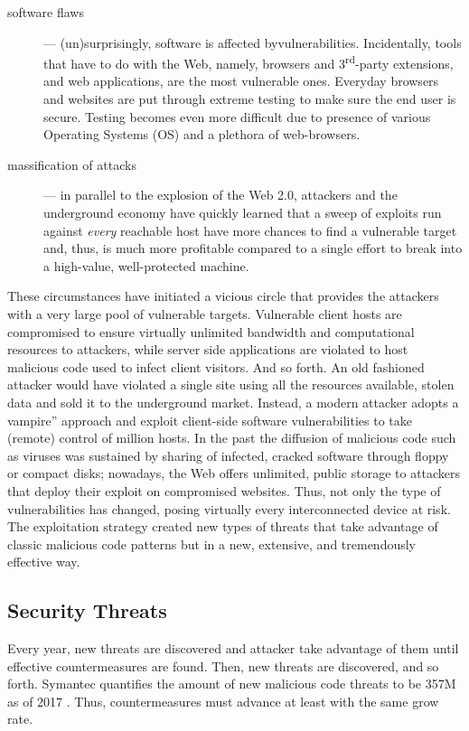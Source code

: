 \documentclass[12pt]{article}
\theoremstyle{definition}
\begin{document}
		
		\begin{description}
			\item[software flaws] --- (un)surprisingly, software is affected byvulnerabilities. Incidentally, tools that have to do with the Web,
			namely, browsers and 3\textsuperscript{rd}-party extensions, and web
			applications, are the most vulnerable ones. Everyday browsers and websites are put through extreme testing to make sure the end user is secure. Testing becomes even more difficult due to presence of various Operating Systems (OS) and a plethora of web-browsers.
			
			\item[massification of attacks] --- in parallel to the explosion of the Web 2.0, attackers and the underground economy have quickly learned that a sweep of exploits run against \emph{every} reachable host have more chances to find a vulnerable target and, thus, is much more profitable compared to a single effort to break into a high-value, well-protected machine.
		\end{description}
		
		These circumstances have initiated a vicious circle that provides the attackers with a very large pool of vulnerable targets. Vulnerable client hosts are compromised to ensure virtually unlimited bandwidth and computational resources to attackers, while server side applications are violated to host malicious code used to infect client visitors. And so forth. An old fashioned attacker would have violated a single site using all the resources available, stolen data and sold it to the underground market. Instead, a modern attacker adopts a vampire'' approach and exploit client-side software vulnerabilities to take (remote) control of million hosts. In the past the diffusion of malicious code such as viruses was sustained by sharing of infected, cracked software through floppy or compact disks; nowadays, the Web offers unlimited, public storage to attackers that deploy their exploit on compromised websites.
 		 Thus, not only the type of vulnerabilities has changed, posing virtually every interconnected device at risk. The exploitation strategy created new types of threats that take advantage of classic malicious code patterns but in a new, extensive, and tremendously effective way.
		
		
		
		\subsection{Security Threats}\label{intro:threats}
		Every year, new threats are discovered and attacker take advantage of them until effective countermeasures are found. Then, new threats are discovered, and so forth. \textsf{Symantec} quantifies the amount of new malicious code threats to be 357M as of 2017 \cite{symantec_threat_report_2017}. Thus, countermeasures must advance at least with the same grow rate.\\
		
\end{document}
